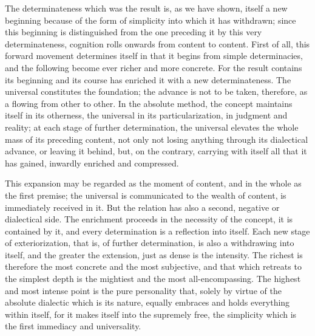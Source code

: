 The determinateness which was the result is,
as we have shown, itself a new beginning
because of the form of simplicity
into which it has withdrawn;
since this beginning is distinguished
from the one preceding it by this very determinateness,
cognition rolls onwards from content to content.
First of all, this forward movement determines itself
in that it begins from simple determinacies,
and the following become ever richer and more concrete.
For the result contains its beginning and its course
has enriched it with a new determinateness.
The universal constitutes the foundation;
the advance is not to be taken, therefore,
as a flowing from other to other.
In the absolute method,
the concept maintains itself in its otherness,
the universal in its particularization,
in judgment and reality;
at each stage of further determination,
the universal elevates the whole mass of its preceding content,
not only not losing anything through its dialectical advance,
or leaving it behind, but, on the contrary,
carrying with itself all that it has gained,
inwardly enriched and compressed.

This expansion may be regarded as
the moment of content,
and in the whole as the first premise;
the universal is communicated to the wealth of content,
is immediately received in it.
But the relation has also a second,
negative or dialectical side.
The enrichment proceeds in the
necessity of the concept,
it is contained by it,
and every determination is
a reflection into itself.
Each new stage of exteriorization,
that is, of further determination,
is also a withdrawing into itself,
and the greater the extension,
just as dense is the intensity.
The richest is therefore
the most concrete and the most subjective,
and that which retreats to the simplest depth is
the mightiest and the most all-encompassing.
The highest and most intense point is
the pure personality that,
solely by virtue of the
absolute dialectic which is its nature,
equally embraces and holds everything within itself,
for it makes itself into the supremely free,
the simplicity which is
the first immediacy and universality.

